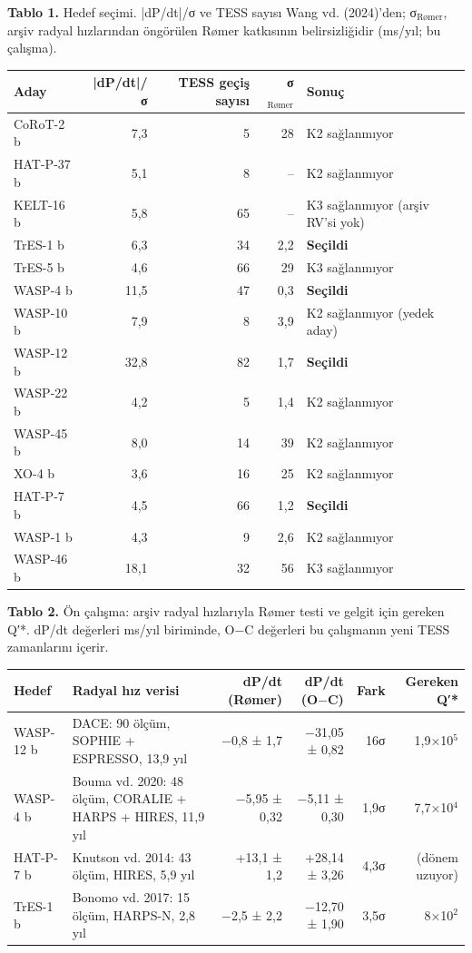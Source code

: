 \begin{center}
\small
\textbf{Tablo 1.} Hedef seçimi. |dP/dt|/σ ve TESS sayısı Wang vd. (2024)'den; σ$_\text{Rømer}$, arşiv radyal hızlarından öngörülen Rømer katkısının belirsizliğidir (ms/yıl; bu çalışma).\\[0.3em]
\begin{tabularx}{\textwidth}{l r r r >{\raggedright\arraybackslash}X}
\toprule
Aday & |dP/dt|/σ & TESS geçiş sayısı & σ$_\text{Rømer}$ & Sonuç\\
\midrule
CoRoT-2 b  & 7,3  & 5  & 28   & K2 sağlanmıyor\\
HAT-P-37 b & 5,1  & 8  & --   & K2 sağlanmıyor\\
KELT-16 b  & 5,8  & 65 & --   & K3 sağlanmıyor (arşiv RV'si yok)\\
TrES-1 b   & 6,3  & 34 & 2,2  & \textbf{Seçildi}\\
TrES-5 b   & 4,6  & 66 & 29   & K3 sağlanmıyor\\
WASP-4 b   & 11,5 & 47 & 0,3  & \textbf{Seçildi}\\
WASP-10 b  & 7,9  & 8  & 3,9  & K2 sağlanmıyor (yedek aday)\\
WASP-12 b  & 32,8 & 82 & 1,7  & \textbf{Seçildi}\\
WASP-22 b  & 4,2  & 5  & 1,4  & K2 sağlanmıyor\\
WASP-45 b  & 8,0  & 14 & 39   & K2 sağlanmıyor\\
XO-4 b     & 3,6  & 16 & 25   & K2 sağlanmıyor\\
HAT-P-7 b  & 4,5  & 66 & 1,2  & \textbf{Seçildi}\\
WASP-1 b   & 4,3  & 9  & 2,6  & K2 sağlanmıyor\\
WASP-46 b  & 18,1 & 32 & 56   & K3 sağlanmıyor\\
\bottomrule
\end{tabularx}
\end{center}

\begin{center}
\small
\textbf{Tablo 2.} Ön çalışma: arşiv radyal hızlarıyla Rømer testi ve gelgit için gereken Q′*. dP/dt değerleri ms/yıl biriminde, O$-$C değerleri bu çalışmanın yeni TESS zamanlarını içerir.\\[0.3em]
\begin{tabularx}{\textwidth}{l >{\raggedright\arraybackslash}X r r r r}
\toprule
Hedef & Radyal hız verisi & dP/dt (Rømer) & dP/dt (O$-$C) & Fark & Gereken Q′*\\
\midrule
WASP-12 b & DACE: 90 ölçüm, SOPHIE + ESPRESSO, 13,9 yıl & −0,8 ± 1,7 & −31,05 ± 0,82 & 16σ & 1,9×10$^5$\\
WASP-4 b  & Bouma vd. 2020: 48 ölçüm, CORALIE + HARPS + HIRES, 11,9 yıl & −5,95 ± 0,32 & −5,11 ± 0,30 & 1,9σ & 7,7×10$^4$\\
HAT-P-7 b & Knutson vd. 2014: 43 ölçüm, HIRES, 5,9 yıl & +13,1 ± 1,2 & +28,14 ± 3,26 & 4,3σ & (dönem uzuyor)\\
TrES-1 b  & Bonomo vd. 2017: 15 ölçüm, HARPS-N, 2,8 yıl & −2,5 ± 2,2 & −12,70 ± 1,90 & 3,5σ & 8×10$^2$\\
\bottomrule
\end{tabularx}
\end{center}

